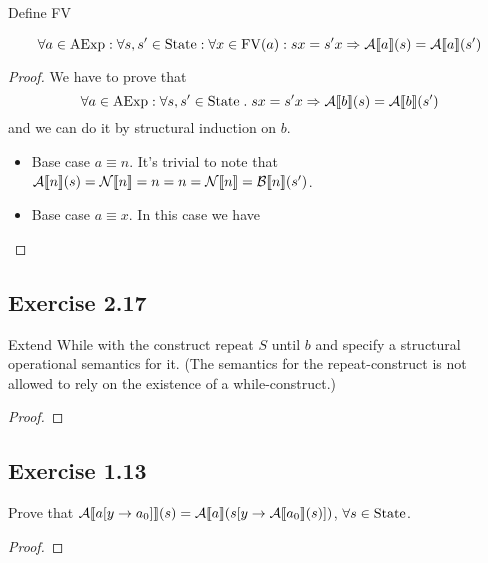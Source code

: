 \documentclass[12pt,a4paper,oneside]{book}
\begin{document}
\begin{definition}
    \label{ex_1_12_fv}
    Define FV 
\end{definition}

\begin{lemma}
    \label{ex_1_12_lemma}
    \[
    \forall a \in \mathrm{AExp} \mathrel{:} \forall s, s' \in \mathrm{State} \mathrel{:} \forall x \in \mathrm{FV}(a) \mathrel{:} sx = s'x \Rightarrow \mathcal{A} \llbracket a \rrbracket (s) = \mathcal{A} \llbracket a \rrbracket (s')
    \]

    \begin{proof}
        We have to prove that
        \[
        \forall a \in \mathrm{AExp} \mathrel{:} \forall s, s' \in \mathrm{State} \mathrel{.} sx = s'x \Rightarrow \mathcal{A} \llbracket b \rrbracket (s) = \mathcal{A} \llbracket b \rrbracket (s')
        \]
        and we can do it by structural induction on $b$.

        \begin{itemize}
            \item Base case $a \equiv n$. It's trivial to note that $\mathcal{A} \llbracket n \rrbracket (s) = \mathcal{N} \llbracket n \rrbracket = n = n = \mathcal{N} \llbracket n \rrbracket = \mathcal{B} \llbracket n \rrbracket (s')$.
            \item Base case $a \equiv x$. In this case we have
        \end{itemize}
    \end{proof}
\end{lemma}

\subsection{Exercise 2.17}
\begin{exercise}
    Extend While with the construct repeat $S$ until $b$ and specify a structural operational semantics for it. (The semantics for the repeat-construct is not allowed to rely on the existence of a while-construct.)

    \begin{proof}
        \prooftree
        \justifies
           \to {}
        \endprooftree
    \end{proof}
\end{exercise}

\subsection{Exercise 1.13}

\begin{exercise}
    Prove that $\mathcal{A} \llbracket  a[y \to a_0]  \rrbracket (s) = \mathcal{A} \llbracket a \rrbracket (s[y \to \mathcal{A} \llbracket a_0 \rrbracket (s)])$, $\forall s \in \mathrm{State}$.

    \begin{proof}
    \end{proof}
\end{exercise}
\end{document}
